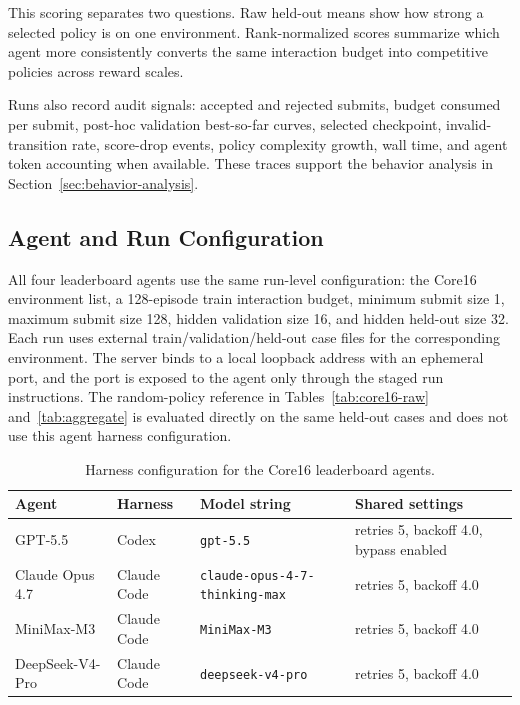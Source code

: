 This scoring separates two questions. Raw held-out means show how strong a
selected policy is on one environment. Rank-normalized scores summarize which
agent more consistently converts the same interaction budget into competitive
policies across reward scales.

Runs also record audit signals: accepted and rejected submits, budget consumed
per submit, post-hoc validation best-so-far curves, selected checkpoint,
invalid-transition rate, score-drop events, policy complexity growth, wall
time, and agent token accounting when available. These traces support the
behavior analysis in Section~\ref{sec:behavior-analysis}.

\subsection{Agent and Run Configuration}
\label{app:agent-run-configuration}

All four leaderboard agents use the same run-level configuration: the Core16
environment list, a 128-episode train interaction budget, minimum submit size
1, maximum submit size 128, hidden validation size 16, and hidden held-out size
32. Each run uses external train/validation/held-out case files for the
corresponding environment. The server binds to a local loopback address with an
ephemeral port, and the port is exposed to the agent only through the staged
run instructions. The random-policy reference in Tables~\ref{tab:core16-raw}
and~\ref{tab:aggregate} is evaluated directly on the same held-out cases and
does not use this agent harness configuration.

\begin{table}[H]
\caption{Harness configuration for the Core16 leaderboard agents.}
\label{tab:agent-config}
\begin{center}
\footnotesize
\setlength{\tabcolsep}{4pt}
\begin{tabular}{llll}
\toprule
Agent & Harness & Model string & Shared settings \\
\midrule
GPT-5.5 & Codex & \texttt{gpt-5.5} & retries 5, backoff 4.0, bypass enabled \\
Claude Opus 4.7 & Claude Code & \texttt{claude-opus-4-7-thinking-max} & retries 5, backoff 4.0 \\
MiniMax-M3 & Claude Code & \texttt{MiniMax-M3} & retries 5, backoff 4.0 \\
DeepSeek-V4-Pro & Claude Code & \texttt{deepseek-v4-pro} & retries 5, backoff 4.0 \\
\bottomrule
\end{tabular}
\end{center}
\end{table}

